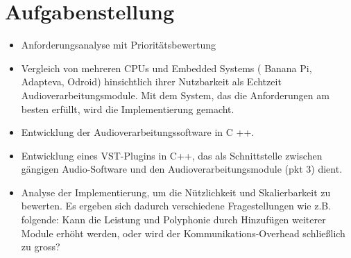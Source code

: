 \section{Aufgabenstellung}

\begin{itemize}

\item Anforderungsanalyse mit Prioritätsbewertung

\item Vergleich von mehreren CPUs und Embedded Systems ( Banana Pi, Adapteva, Odroid) hinsichtlich ihrer Nutzbarkeit als Echtzeit Audioverarbeitungsmodule. Mit dem System, das die Anforderungen am besten erfüllt, wird die Implementierung gemacht.

\item Entwicklung der Audioverarbeitungssoftware in C ++.

\item Entwicklung eines VST-Plugins in C++, das als Schnittstelle zwischen gängigen Audio-Software und den Audioverarbeitungsmodule (pkt 3) dient.

\item Analyse der Implementierung, um die Nützlichkeit und Skalierbarkeit zu bewerten. Es ergeben sich dadurch verschiedene Fragestellungen wie z.B. folgende: Kann die Leistung und Polyphonie durch Hinzufügen weiterer Module erhöht werden, oder wird der Kommunikations-Overhead schließlich zu gross?

\end{itemize}


